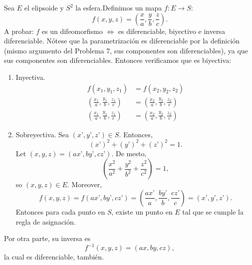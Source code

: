 \begin{problema}
\begin{enumerate}
\begin{sol}
            Sea $E$ el elipsoide y $S^2$ la esfera.Definimos un mapa $f: E \rightarrow S$:  $$ f(x,y,z) = \left(\frac{x}{a},\frac{y}{b},\frac{z}{c}\right). $$ A probar: $f$ es un difeomorfismo $\iff$ es diferenciable, biyectivo e inversa diferenciable. Nótese que la parametrización es diferenciable por la definición (mismo argumento del Problema 7, sus componentes son diferenciables), ya que sus componentes son diferenciables. Entonces verificamos que es biyectiva: 
            \begin{enumerate}
                \item Inyectiva. 
                \begin{align*}
                    f(x_1,y_1,z_1) &= f(x_2,y_2,z_2)\\
                    \left(\frac{x_1}{a},\frac{y_1}{b},\frac{z_1}{c}\right) &= \left(\frac{x_2}{a},\frac{y_2}{b},\frac{z_2}{c}\right)\\
                    \left(\frac{x_1}{a},\frac{y_1}{b},\frac{z_1}{c}\right) &= \left(\frac{x_2}{a},\frac{y_2}{b},\frac{z_2}{c}\right)
                \end{align*}
                \item Sobreyectiva. Sea $(x’,y’,z’) \in S$. Entonces, $$ (x’)^2 + (y’)^2 + (z’)^2 = 1. $$ Let $(x,y,z) = (ax’,by’,cz’)$. De mesto, $$ \left(\frac{x^2}{a^2}+\frac{y^2}{b^2}+\frac{z^2}{c^2}\right) = 1, $$ so $(x,y,z) \in E$. Moreover, $$ f(x,y,z) = f(ax’,by’,cz’) = \left(\frac{ax’}{a},\frac{by’}{b},\frac{cz’}{c}\right) = (x’,y’,z’). $$ Entonces para cada punto en $S$, existe un punto en  $E$ tal que se cumple la regla de asignación. 
            \end{enumerate}

Por otra parte, su inversa es $$ f^{-1}(x,y,z)=(ax,by,cz), $$
la cual es diferenciable, también. 

        \end{sol}
        
    \end{enumerate}
\end{problema}
%
%

